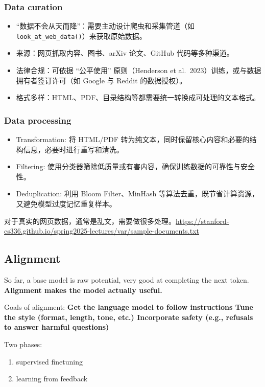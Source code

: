\subsubsection{Data curation}
\begin{itemize}[leftmargin=*]
  \item “数据不会从天而降”：需要主动设计爬虫和采集管道（如 \texttt{look\_at\_web\_data()}）来获取原始数据。
  \item 来源：网页抓取内容、图书、arXiv 论文、GitHub 代码等多种渠道。
  \item 法律合规：可依据 “公平使用” 原则（Henderson et al.\ 2023）训练，或与数据拥有者签订许可（如 Google 与 Reddit 的数据授权）。
  \item 格式多样：HTML、PDF、目录结构等都需要统一转换成可处理的文本格式。
\end{itemize}

  
\subsubsection{Data processing}
\begin{itemize}[leftmargin=*]
  \item Transformation: 将 HTML/PDF 转为纯文本，同时保留核心内容和必要的结构信息，必要时进行重写和清洗。
  \item Filtering: 使用分类器筛除低质量或有害内容，确保训练数据的可靠性与安全性。
  \item Deduplication: 利用 Bloom Filter、MinHash 等算法去重，既节省计算资源，又避免模型过度记忆重复样本。
\end{itemize}

对于真实的网页数据，通常是乱文，需要做很多处理。\href{例子}{https://stanford-cs336.github.io/spring2025-lectures/var/sample-documents.txt}

\subsection{Alignment}
So far, a base model is raw potential, very good at completing the next token. \textbf{Alignment makes the model actually useful.}    

{\color{tred}
Goals of alignment:
\textbf{Get the language model to follow instructions
Tune the style (format, length, tone, etc.)
Incorporate safety (e.g., refusals to answer harmful questions)}
}

Two phases:
    \begin{enumerate}
        \item supervised finetuning
        \item learning from feedback
    \end{enumerate}

